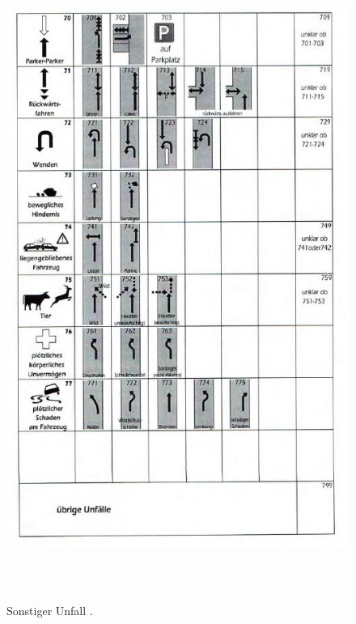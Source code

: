 \begin{savenotes}
	\begin{figure}[H]
		\centering
		\includegraphics[width=13cm,height=21cm]{figures/FT7}
		\caption[Sonstiger Unfall nach GDV]{Sonstiger Unfall \parencite[S. 21]{GesamtverbandderDeutschenVersicherungswirtschafte.V..2016}. }\label{fig:FT7}
	\end{figure}
\end{savenotes}

